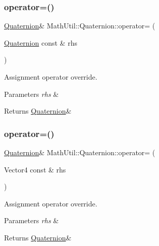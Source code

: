 \subsubsection{\texorpdfstring{operator=()}{operator=()}\hspace{0.1cm}{\footnotesize\ttfamily [1/2]}}
{\footnotesize\ttfamily \hyperlink{structMathUtil_1_1Quaternion}{Quaternion}\& Math\+Util\+::\+Quaternion\+::operator= (\begin{DoxyParamCaption}\item[{\hyperlink{structMathUtil_1_1Quaternion}{Quaternion} const \&}]{rhs }\end{DoxyParamCaption})\hspace{0.3cm}{\ttfamily [inline]}}



Assignment operator override. 


\begin{DoxyParams}{Parameters}
{\em rhs} & \\
\hline
\end{DoxyParams}
\begin{DoxyReturn}{Returns}
\hyperlink{structMathUtil_1_1Quaternion}{Quaternion}\& 
\end{DoxyReturn}
\mbox{\label{structMathUtil_1_1Quaternion_a1267584036a5e73bcc1b72bdee59861a}} 
\subsubsection{\texorpdfstring{operator=()}{operator=()}\hspace{0.1cm}{\footnotesize\ttfamily [2/2]}}
{\footnotesize\ttfamily \hyperlink{structMathUtil_1_1Quaternion}{Quaternion}\& Math\+Util\+::\+Quaternion\+::operator= (\begin{DoxyParamCaption}\item[{Vector4 const \&}]{rhs }\end{DoxyParamCaption})\hspace{0.3cm}{\ttfamily [inline]}}



Assignment operator override. 


\begin{DoxyParams}{Parameters}
{\em rhs} & \\
\hline
\end{DoxyParams}
\begin{DoxyReturn}{Returns}
\hyperlink{structMathUtil_1_1Quaternion}{Quaternion}\& 
\end{DoxyReturn}
\mbox{\label{structMathUtil_1_1Quaternion_a501426c95a2a54a1cbc9cb5a7da17e70}} 
